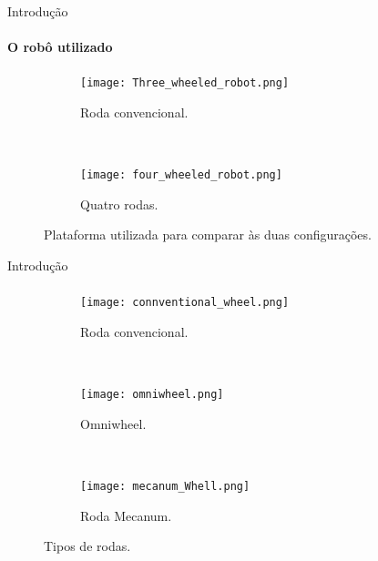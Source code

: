 \begin{frame}[t]{Introdução}
  \framesubtitle{O robô utilizado}
  \transdissolve[duration=0.5]

  \begin{figure}[ht!]
    \begin{subfigure}[b]{0.3\textwidth}
      \centering
      \texttt{[image: Three\_wheeled\_robot.png]}
      \caption{Roda convencional.}
      \label{fig:3_wheels_robot}
    \end{subfigure}
    ~
    \begin{subfigure}[b]{0.3\textwidth}
      \texttt{[image: four\_wheeled\_robot.png]}
      \caption{Quatro rodas.}
      \label{fig:4_wheels_robot}
    \end{subfigure}
    
  \caption{Plataforma utilizada para comparar às duas configurações. \cite{Oliveira2008}}
  \end{figure}
  
\end{frame}

\begin{frame}[t]{Introdução}
  \framesubtitle{}
  \transdissolve[duration=0.5]

  \begin{figure}[ht!]
    \centering
    \begin{subfigure}[b]{0.28\textwidth}
      \centering
      \texttt{[image: connventional\_wheel.png]}
      \caption{Roda convencional.}
      \label{fig:Conventional_wheel}
    \end{subfigure}
    ~
    \begin{subfigure}[b]{0.28\textwidth}
      \texttt{[image: omniwheel.png]}
      \caption{Omniwheel.}
      \label{ominiwheel}
    \end{subfigure}
    ~
    \begin{subfigure}[b]{0.28\textwidth}
      \texttt{[image: mecanum\_Whell.png]}
      \caption{Roda Mecanum.}
      \label{mecanum_wheel}
    \end{subfigure}
    
  \caption{Tipos de rodas.}
  \end{figure}
  
\end{frame}

